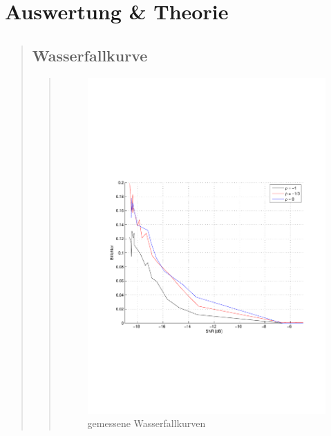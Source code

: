 \section{Auswertung \& Theorie}
\begin{quote}
    
    \subsection{Wasserfallkurve}
    
    \begin{quote}
    
    	\begin{figure}[H]
          \centering
           \includegraphics[scale=0.7, trim = 2cm 7cm 1cm 8cm, clip]{Bilder/Gemessen_Wasserfall}
            \caption{gemessene Wasserfallkurven}
          \label{fig:gemess_Wasser}
        \end{figure}
       

\end{quote}
\end{quote}
